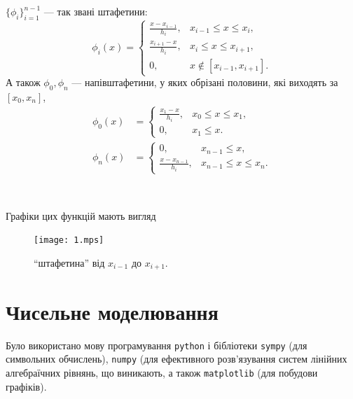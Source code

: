 \begin{minipage}[t]{.475\textwidth}
    \begin{example*}
    $\{\phi_i\}_{i = 1}^{n - 1}$ --- так звані штафетини:
        \begin{equation}
        \label{eq:2.3.9}
            \phi_i(x) = \begin{cases}
                \frac{x - x_{i - 1}}{h_i}, & x_{i - 1} \le x \le x_i, \\[.5ex]
                \frac{x_{i + 1} - x}{h_i}, & x_i \le x \le x_{i + 1}, \\
                0, & x \not\in [x_{i - 1}, x_{i + 1}].
            \end{cases}
        \end{equation}
        А також $\phi_0, \phi_n$ --- напівштафетини, у яких обрізані половини, які виходять за $[x_0, x_n]$,
        \begin{align*}
            \phi_0(x) &= \begin{cases}
                \frac{x_1 - x}{h_i}, & x_0 \le x \le x_1, \\
                0, & x_1 \le x.
            \end{cases} \\
            \phi_n(x) &= \begin{cases}
                0, & x_{n - 1} \le x, \\
                \frac{x - x_{n - 1}}{h_i}, & x_{n - 1} \le x \le x_n.
            \end{cases}
        \end{align*}
    \end{example*}
\end{minipage}
\begin{minipage}[t]{.05\textwidth}
    $\left.\right.$
\end{minipage}
\begin{minipage}[t]{.475\textwidth}
    Графіки цих функцій мають вигляд
    \begin{figure}[H]
        \centering
        \texttt{[image: 1.mps]} %
        \caption{``штафетина'' від $x_{i - 1}$ до $x_{i + 1}$.}
    \end{figure}
\end{minipage}

\section{Чисельне моделювання}

Було використано мову програмування \verb|python| і бібліотеки \verb|sympy| (для символьних обчислень), \verb|numpy| (для ефективного розв'язування систем лінійних алгебраїчних рівнянь, що виникають, а також \verb|matplotlib| (для побудови графіків).


